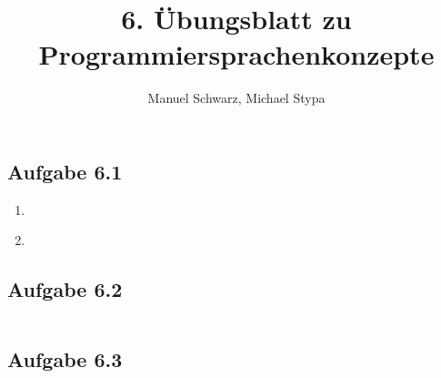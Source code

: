 \documentclass[a4paper, 12pt]{article}
\title{6. Übungsblatt zu Programmiersprachenkonzepte}
\author{Manuel Schwarz, Michael Stypa}
\begin{document}
\maketitle

\subsection*{Aufgabe 6.1}
\begin{enumerate}
  \item \inputminted{common-lisp}{mycount.lisp}
  \item \inputminted{common-lisp}{mycount-if.lisp}
\end{enumerate}

\subsection*{Aufgabe 6.2}
\inputminted{common-lisp}{matmulmat.lisp}

\subsection*{Aufgabe 6.3}
\inputminted{common-lisp}{matpack.lisp}
\end{document}
